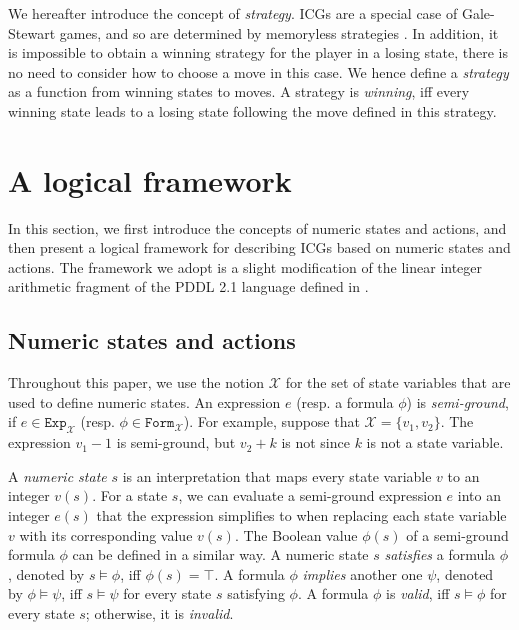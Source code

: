 \documentclass[review]{elsarticle}
\newcommand{\Exp}{\mathtt{Exp}}
\newcommand{\formula}{\mathtt{Form}}
\newcommand{\set}[1]{\{ #1 \}}
\newcommand{\true}{\top}
\newcommand{\statevar}{\mathcal{X}}
\begin{document}
	We hereafter introduce the concept of \textit{strategy}.
	ICGs are a special case of Gale-Stewart games, and so are determined by memoryless strategies \cite{GalS1953}.
	In addition, it is impossible to obtain a winning strategy for the player in a losing state, there is no need to consider how to choose a move in this case.
	We hence define a \textit{strategy} as a function from winning states to moves.
	A strategy is \textit{winning}, iff every winning state leads to a losing state following the move defined in this strategy.


	
\section{A logical framework}
	In this section, we first introduce the concepts of numeric states and actions, and then present a logical framework for describing ICGs based on numeric states and actions.
	The framework we adopt is a slight modification of the linear integer arithmetic fragment of the PDDL 2.1 language defined in \cite{FoxL2003}.
	

	\subsection{Numeric states and actions}
	Throughout this paper, we use the notion $\statevar$ for the set of state variables that are used to define numeric states.
	An expression $e$ (resp. a formula $\phi$) is \textit{semi-ground}, if $e \in \Exp_{\statevar}$ (resp. $\phi \in \formula_{\statevar}$).
	For example, suppose that $\statevar = \set{v_1, v_2}$.
	The expression $v_1 - 1$ is semi-ground, but $v_2 + k$ is not since $k$ is not a state variable.
	
	
	A \textit{numeric state} $s$ is an interpretation that maps every state variable $v$ to an integer $v(s)$.
	For a state $s$, we can evaluate a semi-ground expression $e$ into an integer $e(s)$ that the expression simplifies to when replacing each state variable $v$ with its corresponding value $v(s)$.	
	The Boolean value $\phi(s)$ of a semi-ground formula $\phi$ can be defined in a similar way.
	A numeric state $s$ \textit{satisfies} a formula $\phi$, denoted by $s \models \phi$, iff $\phi(s) = \true$.
	A formula $\phi$ \textit{implies} another one $\psi$, denoted by $\phi \models \psi$, iff $s \models \psi$ for every state $s$ satisfying $\phi$.
	A formula $\phi$ is \textit{valid}, iff $s \models \phi$ for every state $s$; otherwise, it is \textit{invalid}.
	
\end{document}

